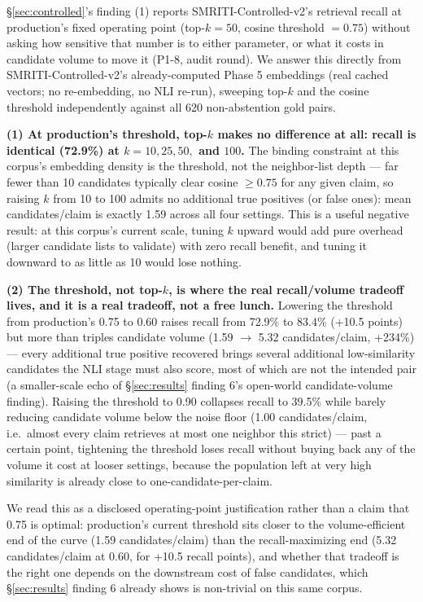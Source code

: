 

\S\ref{sec:controlled}'s finding (1) reports SMRITI-Controlled-v2's
retrieval recall at production's fixed operating point (top-$k=50$,
cosine threshold $=0.75$) without asking how sensitive that number is to
either parameter, or what it costs in candidate volume to move it (P1-8,
audit round). We answer this directly from SMRITI-Controlled-v2's
already-computed Phase 5 embeddings (real cached vectors; no
re-embedding, no NLI re-run), sweeping top-$k$ and the cosine threshold
independently against all 620 non-abstention gold pairs.

\textbf{(1) At production's threshold, top-$k$ makes no difference at
all: recall is identical (72.9\%) at $k=10, 25, 50,$ and $100$.} The
binding constraint at this corpus's embedding density is the threshold,
not the neighbor-list depth --- far fewer than 10 candidates typically
clear cosine $\geq 0.75$ for any given claim, so raising $k$ from 10 to
100 admits no additional true positives (or false ones): mean
candidates/claim is exactly 1.59 across all four settings. This is a
useful negative result: at this corpus's current scale, tuning $k$
upward would add pure overhead (larger candidate lists to validate) with
zero recall benefit, and tuning it downward to as little as 10 would
lose nothing.

\textbf{(2) The threshold, not top-$k$, is where the real recall/volume
tradeoff lives, and it is a real tradeoff, not a free lunch.} Lowering
the threshold from production's 0.75 to 0.60 raises recall from 72.9\%
to 83.4\% (+10.5 points) but more than triples candidate volume (1.59
$\to$ 5.32 candidates/claim, +234\%) --- every additional true positive
recovered brings several additional low-similarity candidates the NLI
stage must also score, most of which are not the intended pair (a smaller-scale
echo of \S\ref{sec:results} finding 6's open-world candidate-volume
finding). Raising the threshold to 0.90 collapses recall to 39.5\% while
barely reducing candidate volume below the noise floor (1.00
candidates/claim, i.e.\ almost every claim retrieves at most one
neighbor this strict) --- past a certain point, tightening the threshold
loses recall without buying back any of the volume it cost at looser
settings, because the population left at very high similarity is
already close to one-candidate-per-claim.

We read this as a disclosed operating-point justification rather than a
claim that 0.75 is optimal: production's current threshold sits closer
to the volume-efficient end of the curve (1.59 candidates/claim) than
the recall-maximizing end (5.32 candidates/claim at 0.60, for +10.5
recall points), and whether that tradeoff is the right one depends on
the downstream cost of false candidates, which \S\ref{sec:results}
finding 6 already shows is non-trivial on this same corpus.
